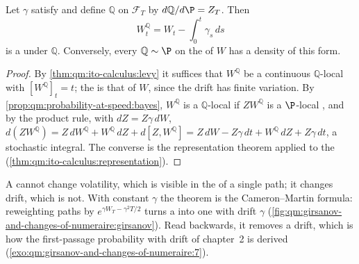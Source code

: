 \begin{theorem}[Girsanov]\label{thm:qm:girsanov-and-changes-of-numeraire:girsanov}
Let $\gamma$ satisfy  and define $\mathbb Q$ on $\mathcal F_T$ by $d\mathbb Q/d\P = Z_T$. Then
\[
W^{\mathbb Q}_t = W_t - \int_0^t\gamma_s\,ds
\]
is a  under $\mathbb Q$. Conversely, every $\mathbb Q \sim \P$ on the  of $W$ has a density
of this form.
\end{theorem}

\begin{proof}
By \cref{thm:qm:ito-calculus:levy} it suffices that $W^{\mathbb Q}$ be a continuous $\mathbb Q$-local  with
$[W^{\mathbb Q}]_t = t$; the  is that of $W$, since the drift has finite variation.
By \cref{prop:qm:probability-at-speed:bayes}, $W^{\mathbb Q}$ is a $\mathbb Q$-local  if $ZW^{\mathbb Q}$ is a
$\P$-local , and by the product rule, with $dZ = Z\gamma\,dW$,
$d(ZW^{\mathbb Q}) = Z\,dW^{\mathbb Q} + W^{\mathbb Q}\,dZ + d[Z, W^{\mathbb Q}] = Z\,dW - Z\gamma\,dt + W^{\mathbb Q}\,dZ + Z\gamma\,dt$, a
stochastic integral. The converse is the  representation theorem applied to the
 (\cref{thm:qm:ito-calculus:representation}).
\end{proof}

A  cannot change volatility, which is visible in the  of a
single path; it changes drift, which is not. With constant $\gamma$ the theorem is the
Cameron--Martin formula: reweighting paths by $e^{\gamma W_T - \gamma^2T/2}$ turns a  into one
with drift $\gamma$ (\cref{fig:qm:girsanov-and-changes-of-numeraire:girsanov}). Read backwards, it removes a
drift, which is how the first-passage probability with drift of chapter~2 is derived
(\cref{exo:qm:girsanov-and-changes-of-numeraire:7}).

